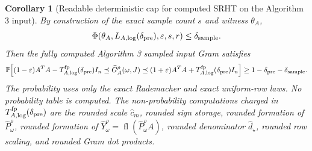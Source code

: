 \documentclass[11pt]{article}
\newcommand{\Prob}{\mathbb{P}}
\newcommand{\fl}{\operatorname{fl}}
\newcommand{\I}{I}
\newcommand{\eps}{\varepsilon}
\newtheorem{corollary}[theorem]{Corollary}
\theoremstyle{remark}
\begin{document}
\begin{corollary}[Readable deterministic cap for computed SRHT on the Algorithm 3 input]
By construction of the exact sample count \(s\) and witness \(\theta_A\),
\[
  \Phi(\theta_A,L_{A,\log}(\delta_{\rm pre}),\eps,s,r)
  \le\delta_{\rm sample}.
\]
Then the fully computed Algorithm 3 sampled input Gram satisfies
\[
  \Prob\!\left[
    (1-\eps)A^TA-T_{A,\log}^{\rm fp}(\delta_{\rm pre})\I_n
    \preceq
    \widehat G_A^\rho(\omega,J)
    \preceq
    (1+\eps)A^TA+T_{A,\log}^{\rm fp}(\delta_{\rm pre})\I_n
  \right]
  \ge
  1-\delta_{\rm pre}-\delta_{\rm sample}.
\]
The probability uses only the exact Rademacher and exact uniform-row laws.  No
probability table is computed.  The non-probability computations charged in
\(T_{A,\log}^{\rm fp}(\delta_{\rm pre})\) are the rounded scale
\(\widehat c_m\), rounded sign storage, rounded formation of
\(\widehat P_\omega^\rho\), rounded formation of
\(\widehat Y_\omega^\rho=\fl(\widehat P_\omega^\rho A)\), rounded denominator
\(\widehat d_\star\), rounded row scaling, and rounded Gram dot products.


\end{corollary}
\end{document}
